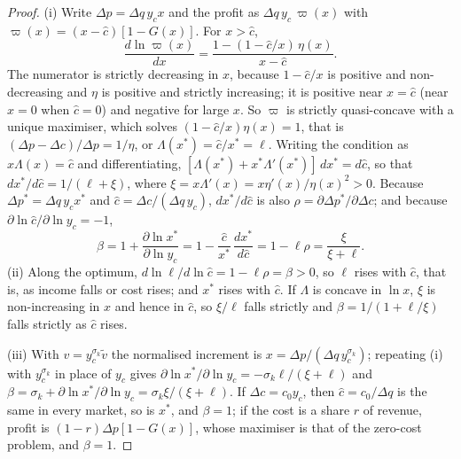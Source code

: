 \documentclass[11pt]{article}
\theoremstyle{definition}
\theoremstyle{remark}
\begin{document}
\begin{proof}
(i) Write $\Delta p=\Delta q\,y_cx$ and the profit as $\Delta q\,y_c\,\varpi(x)$ with $\varpi(x)=(x-\hat c)[1-G(x)]$. For $x>\hat c$,
\[
 \frac{d\ln\varpi(x)}{dx}=\frac{1-(1-\hat c/x)\,\eta(x)}{x-\hat c}.
\]
The numerator is strictly decreasing in $x$, because $1-\hat c/x$ is positive and non-decreasing and $\eta$ is positive and strictly increasing; it is positive near $x=\hat c$ (near $x=0$ when $\hat c=0$) and negative for large $x$. So $\varpi$ is strictly quasi-concave with a unique maximiser, which solves $(1-\hat c/x)\eta(x)=1$, that is $(\Delta p-\Delta c)/\Delta p=1/\eta$, or $\Lambda(x^*)=\hat c/x^*=\ell$. Writing the condition as $x\Lambda(x)=\hat c$ and differentiating, $[\Lambda(x^*)+x^*\Lambda'(x^*)]\,dx^*=d\hat c$, so that $dx^*/d\hat c=1/(\ell+\xi)$, where $\xi=x\Lambda'(x)=x\eta'(x)/\eta(x)^2>0$. Because $\Delta p^*=\Delta q\,y_cx^*$ and $\hat c=\Delta c/(\Delta q\,y_c)$, $dx^*/d\hat c$ is also $\rho=\partial\Delta p^*/\partial\Delta c$; and because $\partial\ln\hat c/\partial\ln y_c=-1$,
\[
 \beta=1+\frac{\partial\ln x^*}{\partial\ln y_c}=1-\frac{\hat c}{x^*}\,\frac{dx^*}{d\hat c}=1-\ell\rho=\frac{\xi}{\xi+\ell}.
\]
(ii) Along the optimum, $d\ln\ell/d\ln\hat c=1-\ell\rho=\beta>0$, so $\ell$ rises with $\hat c$, that is, as income falls or cost rises; and $x^*$ rises with $\hat c$. If $\Lambda$ is concave in $\ln x$, $\xi$ is non-increasing in $x$ and hence in $\hat c$, so $\xi/\ell$ falls strictly and $\beta=1/(1+\ell/\xi)$ falls strictly as $\hat c$ rises.

(iii) With $v=y_c^{\sigma_k}\tilde v$ the normalised increment is $x=\Delta p/(\Delta q\,y_c^{\sigma_k})$; repeating (i) with $y_c^{\sigma_k}$ in place of $y_c$ gives $\partial\ln x^*/\partial\ln y_c=-\sigma_k\ell/(\xi+\ell)$ and $\beta=\sigma_k+\partial\ln x^*/\partial\ln y_c=\sigma_k\xi/(\xi+\ell)$. If $\Delta c=c_0y_c$, then $\hat c=c_0/\Delta q$ is the same in every market, so is $x^*$, and $\beta=1$; if the cost is a share $r$ of revenue, profit is $(1-r)\Delta p[1-G(x)]$, whose maximiser is that of the zero-cost problem, and $\beta=1$.


\end{proof}
\end{document}
